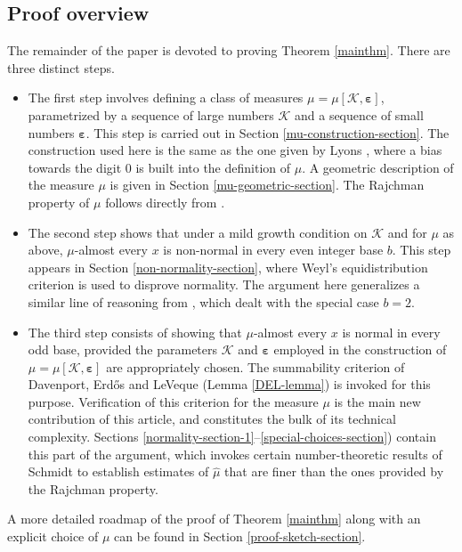 \documentclass[12pt, twoside]{article}
\newtheorem{theorem}{Theorem}[section]
\theoremstyle{definition}
\numberwithin{equation}{section}
\begin{document}
\subsection{Proof overview}
The remainder of the paper is devoted to proving Theorem \ref{mainthm}. There are three distinct steps.
\begin{itemize} 
\item The first step involves defining a class of measures $\mu = \mu[\mathcal K, \pmb{\varepsilon}]$, parametrized by a sequence of large numbers $\mathcal K$ and a sequence of small numbers $\pmb{\varepsilon}$.  This step is carried out in Section \ref{mu-construction-section}. The construction used here is the same as the one given by Lyons \cite{l86}, where a bias towards the digit 0 is built into the definition of $\mu$. A geometric description of the measure $\mu$ is given in Section \ref{mu-geometric-section}. The Rajchman property of $\mu$ follows directly from \cite{l86}.
\item The second step shows that under a mild growth condition on $\mathcal K$ and for $\mu$ as above,  $\mu$-almost every $x$ is non-normal in every even integer base $b$. This step appears in Section \ref{non-normality-section}, where Weyl's equidistribution criterion is used to disprove normality. The argument here generalizes a similar line of reasoning from \cite{l86}, which dealt with the special case $b = 2$.  
\item The third step consists of showing that $\mu$-almost every $x$ is normal in every odd base, provided the parameters $\mathcal K$ and $\pmb{\varepsilon}$ employed in the construction of $\mu = \mu[\mathcal K, \pmb{\varepsilon}]$ are appropriately chosen. The summability criterion of Davenport, Erd\H{o}s and LeVeque (Lemma \ref{DEL-lemma}) is invoked for this purpose. Verification of this criterion for the measure $\mu$ is the main new contribution of this article, and constitutes the bulk of its technical complexity. Sections \ref{normality-section-1}--\ref{special-choices-section}) contain this part of the argument, which invokes certain number-theoretic results of Schmidt \cite{s60} to establish estimates of $\widehat{\mu}$ that are finer than the ones provided by the Rajchman property. 
\end{itemize} 
A more detailed roadmap of the proof of Theorem \ref{mainthm} along with an explicit choice of $\mu$ can be found in Section \ref{proof-sketch-section}.
\end{document}
